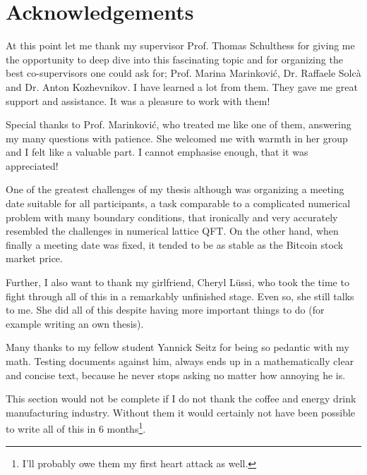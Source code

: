 \documentclass{article}
\theoremstyle{plain} %
\theoremstyle{convention} %
\theoremstyle{remark} %
\numberwithin{equation}{section}
\begin{document}
\newpage

\section{Acknowledgements}

At this point let me thank my supervisor Prof. Thomas Schulthess for giving me the opportunity to deep dive into this fascinating topic and for organizing the best co-supervisors one could ask for; Prof. Marina Marinković, Dr. Raffaele Solcà and Dr. Anton Kozhevnikov. I have learned a lot from them. They gave me great support and assistance. It was a pleasure to work with them!

Special thanks to Prof. Marinković, who treated me like one of them, answering my many questions with patience. She welcomed me with warmth in her group and I felt like a valuable part. I cannot emphasise enough, that it was appreciated!


One of the greatest challenges of my thesis although was organizing a meeting date suitable for all participants, a task comparable to a complicated numerical problem with many boundary conditions, that ironically and very accurately resembled the challenges in numerical lattice QFT. On the other hand, when finally a meeting date was fixed, it tended to be as stable as the Bitcoin stock market price.

Further, I also want to thank my girlfriend, Cheryl Lüssi, who took the time to fight through all of this in a remarkably unfinished stage. Even so, she still talks to me. She did all of this despite having more important things to do (for example writing an own thesis).

Many thanks to my fellow student Yannick Seitz for being so pedantic with my math. Testing documents against him, always ends up in a mathematically clear and concise text, because he never stops asking no matter how annoying he is.

This section would not be complete if I do not thank the coffee and energy drink manufacturing industry. Without them it would certainly not have been possible to write all of this in \num{6} months\footnote{I'll probably owe them my first heart attack as well.}.
\end{document}
